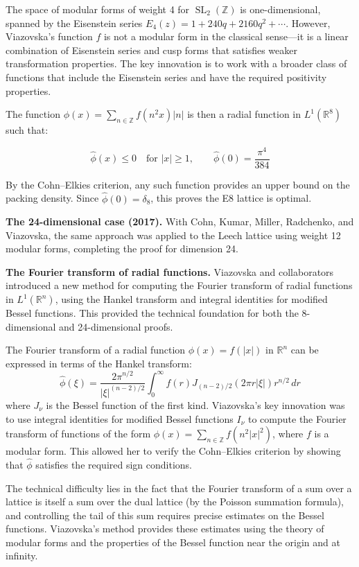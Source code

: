 The space of modular forms of weight 4 for $\operatorname{SL}_2(\mathbb{Z})$ is one-dimensional, spanned by the Eisenstein series $E_4(z) = 1 + 240q + 2160q^2 + \cdots$. However, Viazovska's function $f$ is not a modular form in the classical sense---it is a linear combination of Eisenstein series and cusp forms that satisfies weaker transformation properties. The key innovation is to work with a broader class of functions that include the Eisenstein series and have the required positivity properties.

The function $\phi(x) = \sum_{n \in \mathbb{Z}} f(n^2 x) |n|$ is then a radial function in $L^1(\mathbb{R}^8)$ such that:

\[
\widehat{\phi}(x) \le 0 \quad \text{for } |x| \ge 1, \qquad \widehat{\phi}(0) = \frac{\pi^4}{384}
\]

By the Cohn--Elkies criterion, any such function provides an upper bound on the packing density. Since $\widehat{\phi}(0) = \delta_8$, this proves the E8 lattice is optimal.

\textbf{The 24-dimensional case (2017).} With Cohn, Kumar, Miller, Radchenko, and Viazovska, the same approach was applied to the Leech lattice using weight 12 modular forms, completing the proof for dimension 24.

\textbf{The Fourier transform of radial functions.} Viazovska and collaborators introduced a new method for computing the Fourier transform of radial functions in $L^1(\mathbb{R}^n)$, using the Hankel transform and integral identities for modified Bessel functions. This provided the technical foundation for both the 8-dimensional and 24-dimensional proofs.

The Fourier transform of a radial function $\phi(x) = f(|x|)$ in $\mathbb{R}^n$ can be expressed in terms of the Hankel transform:
\[
\widehat{\phi}(\xi) = \frac{2\pi^{n/2}}{|\xi|^{(n-2)/2}} \int_0^\infty f(r) J_{(n-2)/2}(2\pi r |\xi|) r^{n/2} \, dr
\]
where $J_\nu$ is the Bessel function of the first kind. Viazovska's key innovation was to use integral identities for modified Bessel functions $I_\nu$ to compute the Fourier transform of functions of the form $\phi(x) = \sum_{n \in \mathbb{Z}} f(n^2 |x|^2)$, where $f$ is a modular form. This allowed her to verify the Cohn--Elkies criterion by showing that $\widehat{\phi}$ satisfies the required sign conditions.

The technical difficulty lies in the fact that the Fourier transform of a sum over a lattice is itself a sum over the dual lattice (by the Poisson summation formula), and controlling the tail of this sum requires precise estimates on the Bessel functions. Viazovska's method provides these estimates using the theory of modular forms and the properties of the Bessel function near the origin and at infinity.

